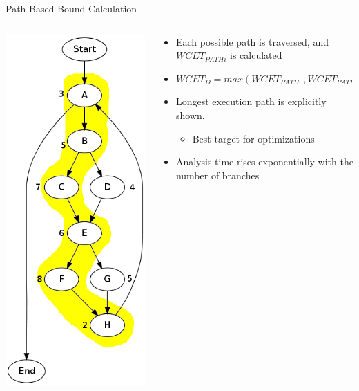 \documentclass{beamer}
\begin{document}
\begin{frame}{Path-Based Bound Calculation}  
    \begin{columns}
    \begin{column}{0.25\textwidth}
      \includegraphics[scale=0.3]{pathoutput.png}
    \end{column}
    \begin{column}{0.75\textwidth}
      \begin{itemize}
        \item Each possible path is traversed, and $WCET_{PATHi}$ is calculated
        \item $WCET_D = max(WCET_{PATH0},WCET_{PATH1},\dots)$
          \pause
        \item Longest execution path is explicitly shown.
          \begin{itemize}
            \item Best target for optimizations
          \end{itemize}
        \item Analysis time rises exponentially with the number of branches
      \end{itemize}
    \end{column}
  \end{columns}
\end{frame}
\end{document}
